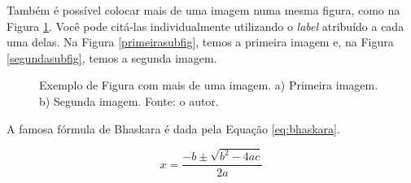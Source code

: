 Também é possível colocar mais de uma imagem numa mesma figura, como na Figura \ref{duasfiguras}. Você pode citá-las individualmente utilizando o \textit{label} atribuído a cada uma delas. Na Figura \ref{primeirasubfig}, temos a primeira imagem e, na Figura \ref{segundasubfig}, temos a segunda imagem.

\begin{figure}[h]
	\centering
	\caption [Exemplo de Figura com mais de uma imagem.]{Exemplo de Figura com mais de uma imagem. a) Primeira imagem. b) Segunda imagem. Fonte: o autor.}
	\label{duasfiguras}
\end{figure}

A famosa fórmula de Bhaskara é dada pela Equação \ref{eq:bhaskara}.

\begin{equation}
    x = \frac{-b \pm \sqrt{b^{2}-4ac}}{2a}
    \label{eq:bhaskara}
\end{equation}
